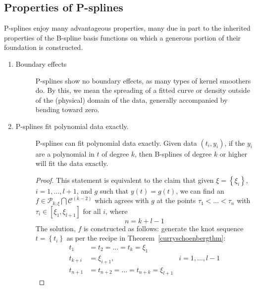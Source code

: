 \documentclass[12pt]{article}
\newcommand{\PP}{\mathcal{P}}
\theoremstyle{definition}
\begin{document}

\subsection{Properties of P-splines}

P-splines enjoy many advantageous properties, many due in part to the inherited properties of the B-spline basis functions on which a generous portion of their foundation is constructed. 

\begin{enumerate} \label{eq:PS_properties}
\item \begin{description}\item[Boundary effects]
 P-splines show no boundary effects, as many types of kernel smoothers do. By this, we mean the spreading of a fitted curve or density outside of the (physical) domain of the data, generally accompanied by bending toward zero.
\end{description}
\item \begin{description}\item[P-splines fit polynomial data exactly.] 
P-splines can fit polynomial data exactly. Given data $\left(t_i,y_i\right)$, if the $y_i$ are a polynomial in $t$ of degree $k$, then B-splines of degree $k$ or higher will fit the data exactly. 
\begin{proof}
This statement is equivalent to the claim that given $\xi = \left\{ \xi_i \right\}$, $i=1,\dots,l+1$, and $g$ such that $y\left(t\right) = g\left(t\right)$, we can find an $f \in \PP_{k,\xi} \bigcap \mathscr{C}^{\left(k-2\right)}$ which agrees with $g$ at the points $\tau_1 < \dots < \tau_n$  with $\tau_i \in \left[\xi_1,\xi_{l+1}\right]$ for all $i$, where
\[
n=k+l-1
\]
The solution, $f$ is constructed as follows: generate the knot sequence $t = \left\{t_i\right\}$ as per the recipe in Theorem~\ref{curryschoenbergthm}:
\begin{align*}
t_1 &= t_2 = \dots = t_k = \xi_1 & \\
t_{k+i} &= \xi_{i+1}, & i=1,\dots,l-1\\
t_{n+1} &= t_{n+2} = \dots = t_{n+k} = \xi_{l+1} & 
\end{align*}


\end{proof}
\end{description}
\end{enumerate}
\end{document}
